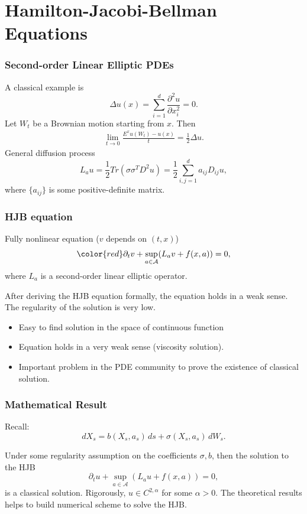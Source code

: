 \documentclass{beamer}
\begin{document}
\section{Hamilton-Jacobi-Bellman Equations}
\begin{frame}
\frametitle{Second-order Linear Elliptic PDEs}
A classical example is 
\begin{equation*}
\Delta u(x) = \sum_{i=1}^d\frac{\partial^2 u}{\partial x_i^2}= 0.
\end{equation*}
Let $W_t$ be a Brownian motion starting from $x$. Then 
\begin{align*}
\lim_{t\to 0}\frac{E^xu(W_t)-u(x)}{t} = \frac{1}{2}\Delta u.%
\end{align*}
General diffusion process
$$L_a u = \frac{1}{2}Tr(\sigma \sigma^T D^2 u) = \frac{1}{2}\sum_{i,j=1}^da_{ij}D_{ij}u,$$ 
where $\{a_{ij}\}$ is some positive-definite matrix.

\end{frame}
\begin{frame}
\frametitle{HJB equation}
Fully nonlinear equation ({\color{red}$v$ depends on $(t,x)$})
\begin{equation*}
{\color{red}\partial_t v} + \sup_{a\in \mathcal{A}}(L_a v +f(x,a)) = 0,
\end{equation*}
where $L_a$ is a second-order linear elliptic operator. 

\vfill
After deriving the HJB equation formally,  the equation holds in a weak sense. The regularity of the solution is very low. 
\begin{itemize}
\item Easy to find solution in the space of continuous function 
\item Equation holds in a very weak sense (viscosity solution).
\item Important problem in the PDE community to prove the existence of classical solution.
\end{itemize}
\end{frame}

\begin{frame}

\frametitle{Mathematical Result}
Recall:
$$
dX_s = b(X_s,a_s)\,ds + \sigma(X_s,a_s)\,dW_s.
$$

Under some regularity assumption on the coefficients $\sigma,b$, then the solution to the HJB
$$
{\partial_t u} + \sup_{a\in \mathcal{A}}(L_a u +f(x,a)) = 0,
$$
is a classical solution. Rigorously, $u\in C^{2,\alpha}$ for some $\alpha>0$. 
\vfill
The theoretical results helps to build numerical scheme to solve the HJB.
\end{frame}
\end{document}
